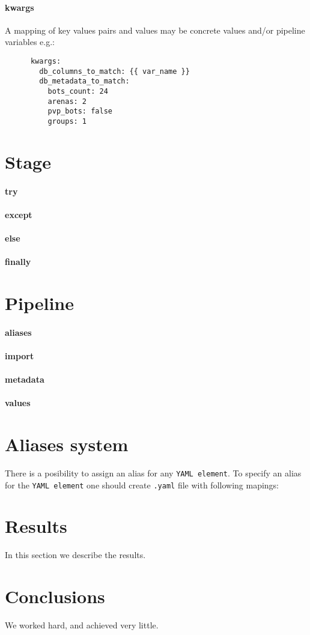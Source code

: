 \documentclass[11pt]{article}
\begin{document}
\paragraph{kwargs}
A mapping of key values pairs and values may be concrete values and/or pipeline variables e.g.:
\begin{verbatim}
      kwargs:
        db_columns_to_match: {{ var_name }}
        db_metadata_to_match:
          bots_count: 24
          arenas: 2
          pvp_bots: false
          groups: 1
\end{verbatim}

\section{Stage}\label{stage_info}
\paragraph{try}
\paragraph{except}
\paragraph{else}
\paragraph{finally}

\section{Pipeline}\label{pipeline_info}
\paragraph{aliases}
\paragraph{import}
\paragraph{metadata}
\paragraph{values}


\section{Aliases system}\label{aliases system}
There is a posibility to assign an alias for any \verb|YAML element|.
To specify an alias for the \verb|YAML element| one should create \verb|.yaml| file with following mapings:

\section{Results}\label{results}
In this section we describe the results.

\section{Conclusions}\label{conclusions}
We worked hard, and achieved very little.



\end{document}
